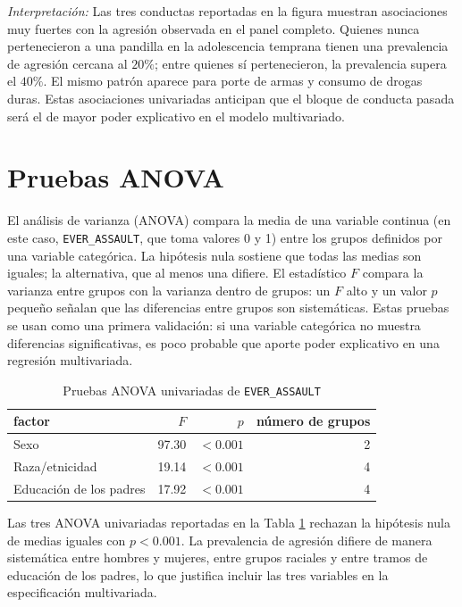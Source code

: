 \documentclass[11pt]{article}
\begin{document}
\emph{Interpretación:} Las tres conductas reportadas en la figura muestran asociaciones muy fuertes con la agresión observada en el panel completo. Quienes nunca pertenecieron a una pandilla en la adolescencia temprana tienen una prevalencia de agresión cercana al $20\%$; entre quienes sí pertenecieron, la prevalencia supera el $40\%$. El mismo patrón aparece para porte de armas y consumo de drogas duras. Estas asociaciones univariadas anticipan que el bloque de conducta pasada será el de mayor poder explicativo en el modelo multivariado.

\section{Pruebas ANOVA}

El análisis de varianza (ANOVA) compara la media de una variable continua (en este caso, \texttt{EVER\_ASSAULT}, que toma valores 0 y 1) entre los grupos definidos por una variable categórica. La hipótesis nula sostiene que todas las medias son iguales; la alternativa, que al menos una difiere. El estadístico $F$ compara la varianza entre grupos con la varianza dentro de grupos: un $F$ alto y un valor $p$ pequeño señalan que las diferencias entre grupos son sistemáticas. Estas pruebas se usan como una primera validación: si una variable categórica no muestra diferencias significativas, es poco probable que aporte poder explicativo en una regresión multivariada.

\begin{table}[H]
\centering
\caption{Pruebas ANOVA univariadas de \texttt{EVER\_ASSAULT}}
\label{tab:anova-uni}
\small
\begin{tabular}{lrrr}
\toprule
factor & $F$ & $p$ & número de grupos \\
\midrule
Sexo & 97.30 & $<0.001$ & 2 \\
Raza/etnicidad & 19.14 & $<0.001$ & 4 \\
Educación de los padres & 17.92 & $<0.001$ & 4 \\
\bottomrule
\end{tabular}
\end{table}

Las tres ANOVA univariadas reportadas en la Tabla \ref{tab:anova-uni} rechazan la hipótesis nula de medias iguales con $p<0.001$. La prevalencia de agresión difiere de manera sistemática entre hombres y mujeres, entre grupos raciales y entre tramos de educación de los padres, lo que justifica incluir las tres variables en la especificación multivariada.
\end{document}
